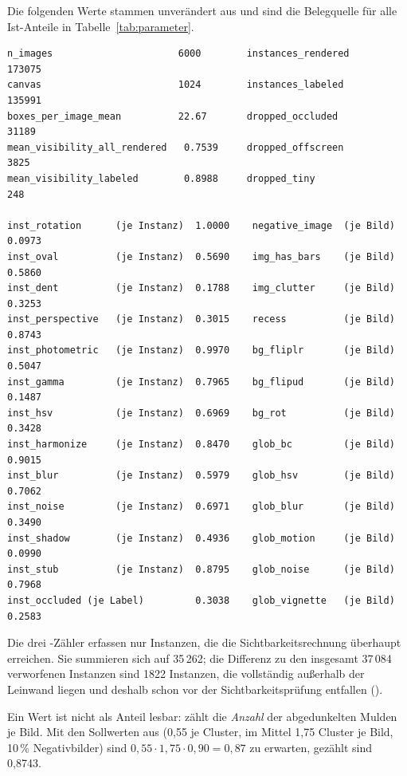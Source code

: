  Die folgenden Werte stammen unverändert aus
 und sind die Belegquelle für alle
Ist-Anteile in Tabelle~\ref{tab:parameter}.

\begin{footnotesize}
\begin{verbatim}
n_images                      6000        instances_rendered      173075
canvas                        1024        instances_labeled       135991
boxes_per_image_mean          22.67       dropped_occluded         31189
mean_visibility_all_rendered   0.7539     dropped_offscreen         3825
mean_visibility_labeled        0.8988     dropped_tiny               248

inst_rotation      (je Instanz)  1.0000    negative_image  (je Bild)  0.0973
inst_oval          (je Instanz)  0.5690    img_has_bars    (je Bild)  0.5860
inst_dent          (je Instanz)  0.1788    img_clutter     (je Bild)  0.3253
inst_perspective   (je Instanz)  0.3015    recess          (je Bild)  0.8743
inst_photometric   (je Instanz)  0.9970    bg_fliplr       (je Bild)  0.5047
inst_gamma         (je Instanz)  0.7965    bg_flipud       (je Bild)  0.1487
inst_hsv           (je Instanz)  0.6969    bg_rot          (je Bild)  0.3428
inst_harmonize     (je Instanz)  0.8470    glob_bc         (je Bild)  0.9015
inst_blur          (je Instanz)  0.5979    glob_hsv        (je Bild)  0.7062
inst_noise         (je Instanz)  0.6971    glob_blur       (je Bild)  0.3490
inst_shadow        (je Instanz)  0.4936    glob_motion     (je Bild)  0.0990
inst_stub          (je Instanz)  0.8795    glob_noise      (je Bild)  0.7968
inst_occluded (je Label)         0.3038    glob_vignette   (je Bild)  0.2583
\end{verbatim}
\end{footnotesize}

Die drei -Zähler erfassen nur Instanzen, die die
Sichtbarkeitsrechnung überhaupt erreichen. Sie summieren sich auf 35\,262;
die Differenz zu den insgesamt 37\,084 verworfenen Instanzen sind 1822
Instanzen, die vollständig außerhalb der Leinwand liegen und deshalb schon
vor der Sichtbarkeitsprüfung entfallen ().

Ein Wert ist nicht als Anteil lesbar:  zählt die \emph{Anzahl} der
abgedunkelten Mulden je Bild. Mit den Sollwerten aus 
(0,55 je Cluster, im Mittel 1,75 Cluster je Bild, 10\,\% Negativbilder) sind
$0{,}55 \cdot 1{,}75 \cdot 0{,}90 = 0{,}87$ zu erwarten, gezählt sind 0,8743.

